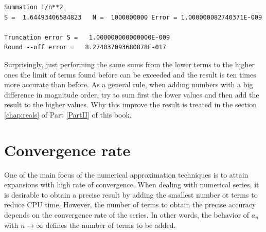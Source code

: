 \begin{verbatim} 
Summation 1/n**2
S =  1.64493406584823   N =  1000000000 Error = 1.000000082740371E-009

Truncation error S =   1.000000000000000E-009
Round --off error =   8.274037093680878E-017
\end{verbatim}
 
Surprisingly, just performing the same sums from the lower terms to the higher ones the 
limit of terms found before can be exceeded and the result is ten times more accurate than before. 
As a general rule, when adding numbers with a big difference in magnitude order, 
try to sum first the lower values and then add the result to the higher values. 
Why this improve the result is 
treated in the section \ref{chap:reals} of Part \ref{PartII} of this book.
 
 

\label{numeric_series}











\newpage 
\section{Convergence rate}  \label{sec:convergence} 
One of the main focus of the numerical approximation techniques is to attain expansions with high rate of convergence. When dealing with 
numerical series, it is desirable to obtain a precise result by adding the smallest number ot terms to reduce CPU time. 
However, the number of terms to obtain the precise accuracy depends on the convergence rate of the series.
In other words, the behavior of $ a_n $ with $ n \rightarrow \infty $ defines the number of terms to be added. 



